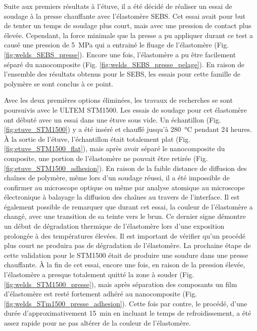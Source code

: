 Suite aux premiers résultats à l'étuve, il a été décidé de réaliser un essai de soudage à la presse chauffante avec l'élastomère SEBS. 
Cet essai avait pour but de tenter un temps de soudage plus court, mais avec une pression de contact plus élevée. 
Cependant, la force minimale que la presse a pu appliquer durant ce test a causé une pression de \SI{5}{\mega\pascal} qui a entrainé le fluage de l'élastomère (Fig. \ref{fig:welds_SEBS_presse}). 
Encore une fois, l'élastomère a pu être facilement séparé du nanocomposite (Fig. \ref{fig:welds_SEBS_presse_pelage}). 
En raison de l'ensemble des résultats obtenus pour le SEBS, les essais pour cette famille de polymère se sont conclus à ce point. 

Avec les deux premières options éliminées, les travaux de recherches se sont poursuivis avec le ULTEM STM1500. 
Les essais de soudage pour cet élastomère ont débuté avec un essai dans une étuve sous vide. 
Un échantillon (Fig. \ref{fig:etuve_STM1500}) y a été inséré et chauffé jusqu'à \SI{280}{\celsius} pendant 24 heures. 
À la sortie de l'étuve, l'échantillon était totalement plat (Fig. \ref{fig:etuve_STM1500_flat}), mais après avoir séparé le nanocomposite du composite, une portion de l'élastomère ne pouvait être retirée (Fig. \ref{fig:etuve_STM1500_adhesion}). 
En raison de la faible distance de diffusion des chaînes de polymère, même lors d'un soudage réussi, il a été impossible de confirmer au microscope optique ou même par analyse atomique au microscope électronique à balayage la diffusion des chaînes au travers de l'interface. 
Il est également possible de remarquer que durant cet essai, la couleur de l'élastomère a changé, avec une transition de sa teinte vers le brun.  
Ce dernier signe démontre un début de dégradation thermique de l'élastomère lors d'une exposition prolongée à des températures élevées. 
Il est important de vérifier qu'un procédé plus court ne produira pas de dégradation de l'élastomère. 
La prochaine étape de cette validation pour le STM1500 était de produire une soudure dans une presse chauffante. 
À la fin de cet essai, encore une fois, en raison de la pression élevée, l'élastomère a presque totalement quitté la zone à souder (Fig. \ref{fig:welds_STM1500_presse}), mais après séparation des composants un film d'élastomère est resté fortement adhéré au nanocomposite (Fig. \ref{fig:welds_STm1500_presse_adhesion}). 
Cette fois par contre, le procédé, d'une durée d'approximativement \SI{15}{\minute} en incluant le temps de refroidissement, a été assez rapide pour ne pas altérer de la couleur de l'élastomère. 

